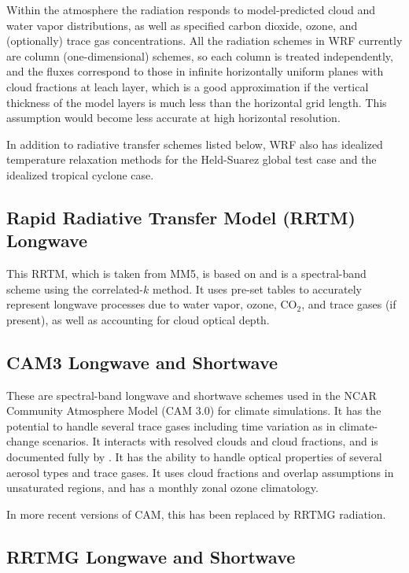 Within the atmosphere the radiation responds to model-predicted 
cloud and water vapor distributions, as well as specified carbon dioxide, 
ozone, and (optionally) trace gas concentrations. All the radiation schemes 
in WRF currently are column (one-dimensional) schemes, so each column is 
treated independently, and the fluxes correspond to those in 
infinite horizontally uniform  planes with cloud fractions at leach layer, which
is a good approximation if the vertical thickness of the model layers is much 
less than the horizontal grid length. This assumption would become less 
accurate at high horizontal resolution.

In addition to radiative transfer schemes listed below, WRF also has idealized
temperature relaxation methods for the Held-Suarez global test case and the
idealized tropical cyclone case.

\subsection{Rapid Radiative Transfer Model (RRTM) Longwave}

This RRTM, which is taken from MM5, is based on \citet{mlawer97} 
and is a spectral-band scheme using the correlated-$k$ method. 
It uses pre-set tables to accurately represent longwave processes due 
to water vapor, ozone, CO$_2$, and trace gases (if present), as well as 
accounting for cloud optical depth.

\subsection {CAM3 Longwave and Shortwave}

These are spectral-band longwave and shortwave schemes used in the NCAR Community Atmosphere
Model (CAM 3.0) for climate simulations. It has the potential to handle
several trace gases including time variation as in climate-change scenarios. 
It interacts with resolved clouds and cloud fractions,
 and is documented fully by \citet{collins04}.  It has the ability to handle optical properties of
several aerosol types and trace gases. It uses cloud fractions and overlap assumptions
in unsaturated regions, and has a monthly zonal ozone climatology.
 
 In more recent versions of CAM, this has been replaced by RRTMG radiation.
 
\subsection {RRTMG Longwave and Shortwave}

